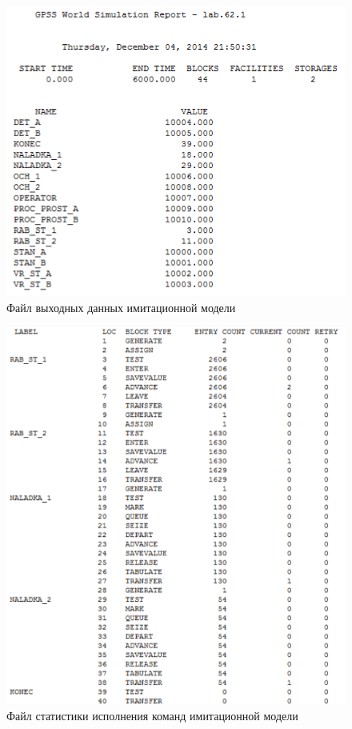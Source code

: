 \begin{figure}[h!]
  \centering
  \includegraphics[width=1\linewidth]{pic/report_1}
  \caption{Файл выходных данных имитационной модели}
  \label{pic:report_1}
\end{figure}

\newpage

\begin{figure}[h!]
  \centering
  \includegraphics[width=1\linewidth]{pic/report_2}
  \caption{Файл статистики исполнения команд имитационной модели}
  \label{pic:report_2}
\end{figure}

